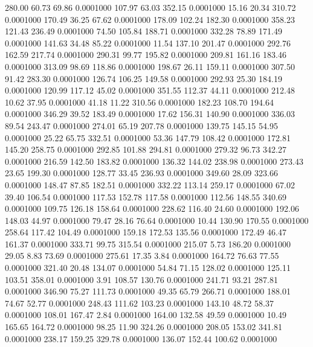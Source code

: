  280.00   60.73   69.86   0.0001000
 107.97   63.03  352.15   0.0001000
  15.16   20.34  310.72   0.0001000
 170.49   36.25   67.62   0.0001000
 178.09  102.24  182.30   0.0001000
 358.23  121.43  236.49   0.0001000
  74.50  105.84  188.71   0.0001000
 332.28   78.89  171.49   0.0001000
 141.63   34.48   85.22   0.0001000
  11.54  137.10  201.47   0.0001000
 292.76  162.59  217.74   0.0001000
 290.31   99.77  195.82   0.0001000
 209.81  161.16  183.46   0.0001000
 313.09   98.69  118.86   0.0001000
 198.67   26.11  159.11   0.0001000
 307.50   91.42  283.30   0.0001000
 126.74  106.25  149.58   0.0001000
 292.93   25.30  184.19   0.0001000
 120.99  117.12   45.02   0.0001000
 351.55  112.37   44.11   0.0001000
 212.48   10.62   37.95   0.0001000
  41.18   11.22  310.56   0.0001000
 182.23  108.70  194.64   0.0001000
 346.29   39.52  183.49   0.0001000
  17.62  156.31  140.90   0.0001000
 336.03   89.54  243.47   0.0001000
 274.01   65.19  207.78   0.0001000
 139.75  145.15   54.95   0.0001000
  25.22   65.75  332.51   0.0001000
  53.36  147.79  108.42   0.0001000
 172.81  145.20  258.75   0.0001000
 292.85  101.88  294.81   0.0001000
 279.32   96.73  342.27   0.0001000
 216.59  142.50  183.82   0.0001000
 136.32  144.02  238.98   0.0001000
 273.43   23.65  199.30   0.0001000
 128.77   33.45  236.93   0.0001000
 349.60   28.09  323.66   0.0001000
 148.47   87.85  182.51   0.0001000
 332.22  113.14  259.17   0.0001000
  67.02   39.40  106.54   0.0001000
 117.53  152.78  117.58   0.0001000
 112.56  148.55  340.69   0.0001000
 109.75  126.18  158.64   0.0001000
 228.62  116.40   24.60   0.0001000
 192.06  148.03   44.97   0.0001000
  79.47   28.16   76.64   0.0001000
  10.44  130.90  170.55   0.0001000
 258.64  117.42  104.49   0.0001000
 159.18  172.53  135.56   0.0001000
 172.49   46.47  161.37   0.0001000
 333.71   99.75  315.54   0.0001000
 215.07    5.73  186.20   0.0001000
  29.05    8.83   73.69   0.0001000
 275.61   17.35    3.84   0.0001000
 164.72   76.63   77.55   0.0001000
 321.40   20.48  134.07   0.0001000
  54.84   71.15  128.02   0.0001000
 125.11  103.51  358.01   0.0001000
   3.91  108.57  130.76   0.0001000
 241.71   93.21  287.81   0.0001000
 346.90   75.27  111.73   0.0001000
  49.35   65.79  266.71   0.0001000
 188.01   74.67   52.77   0.0001000
 248.43  111.62  103.23   0.0001000
 143.10   48.72   58.37   0.0001000
 108.01  167.47    2.84   0.0001000
 164.00  132.58   49.59   0.0001000
  10.49  165.65  164.72   0.0001000
  98.25   11.90  324.26   0.0001000
 208.05  153.02  341.81   0.0001000
 238.17  159.25  329.78   0.0001000
 136.07  152.44  100.62   0.0001000
